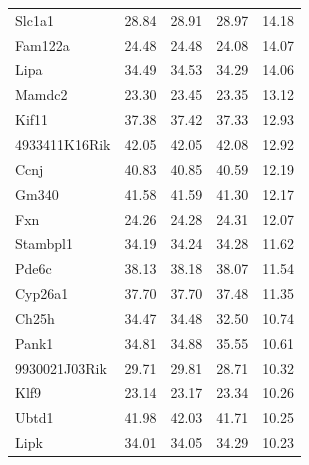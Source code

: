 \documentclass{article}
\begin{document}
\begin{table}[ht]
\begin{tabular}{lrrrr}
  Slc1a1 & 28.84 & 28.91 & 28.97 & 14.18 \\ 
  Fam122a & 24.48 & 24.48 & 24.08 & 14.07 \\ 
  Lipa & 34.49 & 34.53 & 34.29 & 14.06 \\ 
  Mamdc2 & 23.30 & 23.45 & 23.35 & 13.12 \\ 
  Kif11 & 37.38 & 37.42 & 37.33 & 12.93 \\ 
  4933411K16Rik & 42.05 & 42.05 & 42.08 & 12.92 \\ 
  Ccnj & 40.83 & 40.85 & 40.59 & 12.19 \\ 
  Gm340 & 41.58 & 41.59 & 41.30 & 12.17 \\ 
  Fxn & 24.26 & 24.28 & 24.31 & 12.07 \\ 
  Stambpl1 & 34.19 & 34.24 & 34.28 & 11.62 \\ 
  Pde6c & 38.13 & 38.18 & 38.07 & 11.54 \\ 
  Cyp26a1 & 37.70 & 37.70 & 37.48 & 11.35 \\ 
  Ch25h & 34.47 & 34.48 & 32.50 & 10.74 \\ 
  Pank1 & 34.81 & 34.88 & 35.55 & 10.61 \\ 
  9930021J03Rik & 29.71 & 29.81 & 28.71 & 10.32 \\ 
  Klf9 & 23.14 & 23.17 & 23.34 & 10.26 \\ 
  Ubtd1 & 41.98 & 42.03 & 41.71 & 10.25 \\ 
  Lipk & 34.01 & 34.05 & 34.29 & 10.23 \\ 
   \hline 
\end{tabular}
\endgroup
\end{table}
\end{document}
